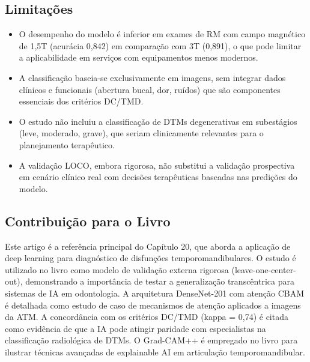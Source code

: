 \subsection{Limitações}
\begin{itemize}
  \item O desempenho do modelo é inferior em exames de RM com campo
        magnético de 1,5T (acurácia 0,842) em comparação com 3T (0,891),
        o que pode limitar a aplicabilidade em serviços com equipamentos
        menos modernos.
  \item A classificação baseia-se exclusivamente em imagens, sem integrar
        dados clínicos e funcionais (abertura bucal, dor, ruídos) que são
        componentes essenciais dos critérios DC/TMD.
  \item O estudo não incluiu a classificação de DTMs degenerativas em
        subestágios (leve, moderado, grave), que seriam clinicamente
        relevantes para o planejamento terapêutico.
  \item A validação LOCO, embora rigorosa, não substitui a validação
        prospectiva em cenário clínico real com decisões terapêuticas
        baseadas nas predições do modelo.
\end{itemize}

\subsection{Contribuição para o Livro}
Este artigo é a referência principal do Capítulo 20, que aborda a aplicação
de deep learning para diagnóstico de disfunções temporomandibulares. O
estudo é utilizado no livro como modelo de validação externa rigorosa
(leave-one-center-out), demonstrando a importância de testar a
generalização transcêntrica para sistemas de IA em odontologia. A
arquitetura DenseNet-201 com atenção CBAM é detalhada como estudo de
caso de mecanismos de atenção aplicados a imagens da ATM. A concordância
com os critérios DC/TMD (kappa = 0,74) é citada como evidência de que a
IA pode atingir paridade com especialistas na classificação radiológica
de DTMs. O Grad-CAM++ é empregado no livro para ilustrar técnicas
avançadas de explainable AI em articulação temporomandibular.

